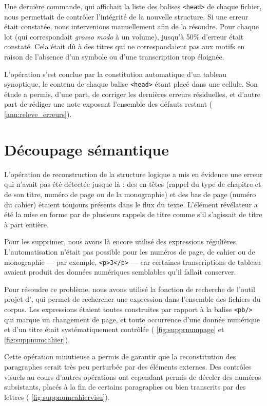 Une dernière commande, qui affichait la liste des balises \texttt{<head>} de chaque fichier, nous permettait de contrôler l'intégrité de la nouvelle structure. Si une erreur était constatée, nous intervenions manuellement afin de la résoudre. Pour chaque lot (qui correspondait \textit{grosso modo} à un volume), jusqu'à 50\% d'erreur était constaté. Cela était dû à des titres qui ne correspondaient pas aux motifs en raison de l'absence d'un symbole ou d'une transcription trop éloignée.

L'opération s'est conclue par la constitution automatique d'un tableau synoptique, le contenu de chaque balise \texttt{<head>} étant placé dans une cellule. Son étude a permis, d'une part, de corriger les dernières erreurs résiduelles, et d'autre part de rédiger une note exposant l'ensemble des défauts restant (\ann{} \ref{ann:releve_erreurs}).

\section{Découpage sémantique}

L'opération de reconstruction de la structure logique a mis en évidence une erreur qui n'avait pas été détectée jusque là : des en-têtes (rappel du type de chapitre et de son titre, numéro de page ou de la monographie) et des bas de page (numéro du cahier) étaient toujours présents dans le flux du texte. L'élément révélateur a été la mise en forme par \lse{} de plusieurs rappels de titre comme s'il s'agissait de titre à part entière. 

Pour les supprimer, nous avons là encore utilisé des expressions régulières. L'automatisation n'était pas possible pour les numéros de page, de cahier ou de monographie --- par exemple, \texttt{<p>3</p>} --- car certaines transcriptions de tableau avaient produit des données numériques semblables qu'il fallait conserver.

Pour résoudre ce problème, nous avons utilisé la fonction de recherche de l'outil \og projet \fg{} d'\oxygen, qui permet de rechercher une expression dans l'ensemble des fichiers du corpus. Les expressions étaient toutes construites par rapport à la balise \texttt{<pb/>} qui marque un changement de page, et toute occurrence d'une donnée numérique et d'un titre était systématiquement contrôlée (\fig{} \ref{fig:supprnumpage} et \ref{fig:suppnumcahier}).

Cette opération minutieuse a permis de garantir que la reconstitution des paragraphes serait très peu perturbée par des éléments externes. Des contrôles visuels au cours d'autres opérations ont cependant permis de déceler des numéros subsistants, placés à la fin de certains paragraphes ou bien transcrits par des lettres (\fig{} \ref{fig:suppnumcahiervisu}).

